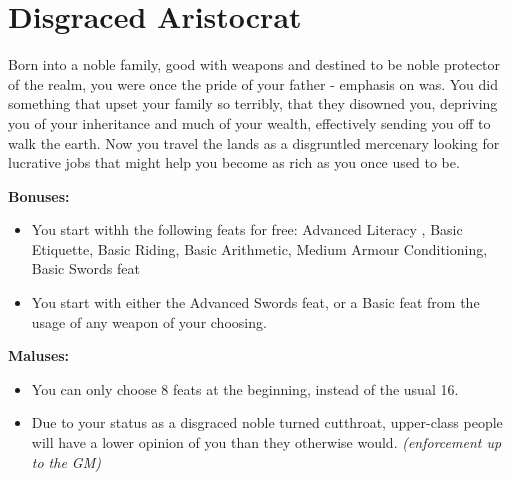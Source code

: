 \section{Disgraced Aristocrat}
Born into a noble family, good with weapons and destined to be noble protector of the realm, you were once the pride of your father - emphasis on was. You did something that upset your family so terribly, that they disowned you, depriving you of your inheritance and much of your wealth, effectively sending you off to walk the earth. Now you travel the lands as a disgruntled mercenary looking for lucrative jobs that might help you become as rich as you once used to be.


\textbf{Bonuses:}
\begin{itemize}
	\item You start withh the following feats for free: Advanced Literacy , Basic Etiquette, Basic Riding, Basic Arithmetic, Medium Armour Conditioning, Basic Swords feat
	\item You start with either the Advanced Swords feat, or a Basic feat from the usage of any weapon of your choosing.
\end{itemize}
\textbf{Maluses:}
\begin{itemize}
	\item You can only choose 8 feats at the beginning, instead of the usual 16.
	\item Due to your status as a disgraced noble turned cutthroat, upper-class people will have a lower opinion of you than they otherwise would. \textit{(enforcement up to the GM)}
\end{itemize}
